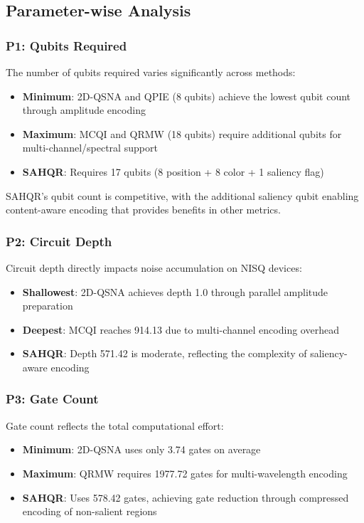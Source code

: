 \documentclass{ipol}
\begin{document}
\subsection{Parameter-wise Analysis}

\subsubsection{P1: Qubits Required}

The number of qubits required varies significantly across methods:

\begin{itemize}
\item \textbf{Minimum}: 2D-QSNA and QPIE (8 qubits) achieve the lowest qubit count through amplitude encoding
\item \textbf{Maximum}: MCQI and QRMW (18 qubits) require additional qubits for multi-channel/spectral support
\item \textbf{SAHQR}: Requires 17 qubits (8 position + 8 color + 1 saliency flag)
\end{itemize}

SAHQR's qubit count is competitive, with the additional saliency qubit enabling content-aware encoding that provides benefits in other metrics.

\subsubsection{P2: Circuit Depth}

Circuit depth directly impacts noise accumulation on NISQ devices:

\begin{itemize}
\item \textbf{Shallowest}: 2D-QSNA achieves depth 1.0 through parallel amplitude preparation
\item \textbf{Deepest}: MCQI reaches 914.13 due to multi-channel encoding overhead
\item \textbf{SAHQR}: Depth 571.42 is moderate, reflecting the complexity of saliency-aware encoding
\end{itemize}

\subsubsection{P3: Gate Count}

Gate count reflects the total computational effort:

\begin{itemize}
\item \textbf{Minimum}: 2D-QSNA uses only 3.74 gates on average
\item \textbf{Maximum}: QRMW requires 1977.72 gates for multi-wavelength encoding
\item \textbf{SAHQR}: Uses 578.42 gates, achieving gate reduction through compressed encoding of non-salient regions
\end{itemize}
\end{document}
